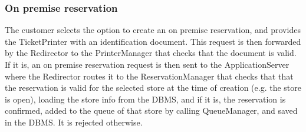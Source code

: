 \subsubsection{On premise reservation}
\begin{figure}[H]
	\noindent
\end{figure}
The customer selects the option to create an on premise reservation, and provides the TicketPrinter with an identification document. This request is then forwarded by the Redirector to the PrinterManager that checks that the document is valid. If it is, an on premise reservation request is then sent to the ApplicationServer where the Redirector routes it to the ReservationManager that checks that that the reservation is valid for the selected store at the time of creation (e.g. the store is open), loading the store info from the DBMS, and if it is, the reservation is confirmed, added to the queue of that store by calling QueueManager, and saved in the DBMS. It is rejected otherwise.
